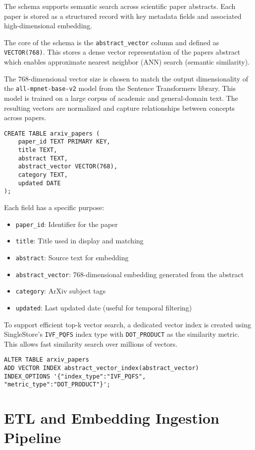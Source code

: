 \documentclass[11pt]{article}
\begin{document}
The schema supports semantic search across scientific paper abstracts. Each paper is stored as a structured record with key metadata fields and associated high-dimensional embedding.

The core of the schema is the \texttt{abstract\_vector} column and defined as \texttt{VECTOR(768)}. This stores a dense vector representation of the papers abstract which enables approximate nearest neighbor (ANN) search (semantic similarity).

The 768-dimensional vector size is chosen to match the output dimensionality of the \texttt{all-mpnet-base-v2} model from the Sentence Transformers library. This model is trained on a large corpus of academic and general-domain text. The resulting vectors are normalized and capture relationships between concepts across papers.

\begin{verbatim}
CREATE TABLE arxiv_papers (
    paper_id TEXT PRIMARY KEY,
    title TEXT,
    abstract TEXT,
    abstract_vector VECTOR(768),
    category TEXT,
    updated DATE
);
\end{verbatim}

Each field has a specific purpose:
\begin{itemize}
\item \texttt{paper\_id}: Identifier for the paper
\item \texttt{title}: Title used in display and matching
\item \texttt{abstract}: Source text for embedding
\item \texttt{abstract\_vector}: 768-dimensional embedding generated from the abstract
\item \texttt{category}: ArXiv subject tags
\item \texttt{updated}: Last updated date (useful for temporal filtering)
\end{itemize}

To support efficient top-k vector search, a dedicated vector index is created using SingleStore's \texttt{IVF\_PQFS} index type with \texttt{DOT\_PRODUCT} as the similarity metric. This allows fast similarity search over millions of vectors.

\begin{verbatim}
ALTER TABLE arxiv_papers
ADD VECTOR INDEX abstract_vector_index(abstract_vector)
INDEX_OPTIONS '{"index_type":"IVF_PQFS", "metric_type":"DOT_PRODUCT"}';
\end{verbatim}
\section{ETL and Embedding Ingestion Pipeline}
\label{sec:org73f69aa}
\end{document}
